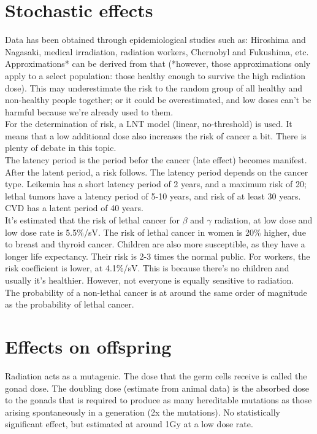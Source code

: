 \section{Stochastic effects}
Data has been obtained through epidemiological studies such as: Hiroshima and Nagasaki, medical irradiation, radiation workers, Chernobyl and Fukushima, etc. Approximations* can be derived from that (*however, those approximations only apply to a select population: those healthy enough to survive the high radiation dose). This may underestimate the risk to the random group of all healthy and non-healthy people together; or it could be overestimated, and low doses can't be harmful because we're already used to them. \\
For the determination of risk, a LNT model (linear, no-threshold) is used. It means that a low additional dose also increases the risk of cancer a bit. There is plenty of debate in this topic.\\
The latency period is the period befor the cancer (late effect) becomes manifest. After the latent period, a risk follows. The latency period depends on the cancer type. Leikemia has a short latency period of 2 years, and a maximum risk of 20; lethal tumors have a latency period of 5-10 years, and risk of at least 30 years. CVD has a latent period of 40 years. \\
It's estimated that the risk of lethal cancer for $\beta$ and $\gamma$ radiation, at low dose and low dose rate is 5.5\%/sV. The risk of lethal cancer in women is 20\% higher, due to breast and thyroid cancer. Children are also more susceptible, as they have a longer life expectancy. Their risk is 2-3 times the normal public. For workers, the risk coefficient is lower, at 4.1\%/sV. This is because there's no children and usually it's healthier. However, not everyone is equally sensitive to radiation.\\ 
The probability of a non-lethal cancer is at around the same order of magnitude as the probability of lethal cancer.
\section{Effects on offspring}
Radiation acts as a mutagenic. The dose that the germ cells receive is called the gonad dose. The doubling dose (estimate from animal data) is the absorbed dose to the gonads that is required to produce as many hereditable mutations as those arising spontaneously in a generation (2x the mutations). No statistically significant effect, but estimated at around 1Gy at a low dose rate.
